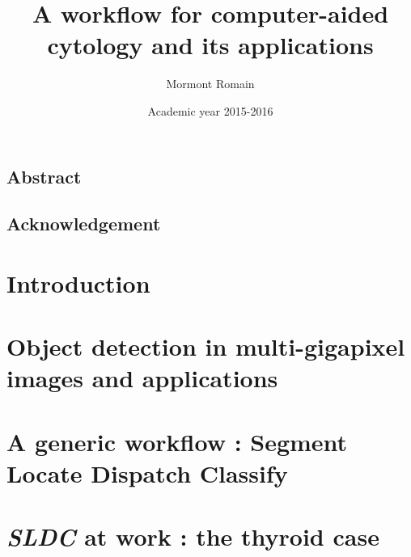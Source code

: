 \documentclass[a4paper,12pt]{report}
\author{Mormont Romain}
\title{A workflow for computer-aided cytology and its applications}
\date{Academic year 2015-2016}
\begin{document}
	
	
	
	\newpage 
	\clearpage
	
	\section*{Abstract}
	
	\newpage
		
	\section*{Acknowledgement}
	
	\newpage
	
	\tableofcontents
	
	\newpage
	\clearpage
	
	\chapter{Introduction}
	
	\newpage
	
	\chapter{Object detection in multi-gigapixel images and applications}
	
	\newpage
	
	\chapter{A generic workflow : Segment Locate Dispatch Classify}
	
	\newpage
	
	\chapter{\textit{SLDC} at work : the thyroid case}
	
	\newpage
	
\end{document}
